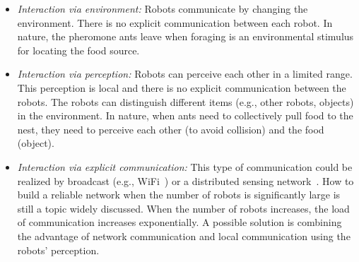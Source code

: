 \begin{itemize}

\item \textit{Interaction via environment:} Robots communicate by changing the environment. There is no explicit communication between each robot. In nature, the pheromone ants leave when foraging is an environmental stimulus for locating the food source.  

\item \textit{Interaction via perception:} Robots can perceive each other in a limited range. This perception is local and there is no explicit communication between the robots. The robots can distinguish different items (e.g., other robots, objects) in the environment. In nature, when ants need to collectively pull food to the nest, they need to perceive each other (to avoid collision) and the food (object).

\item \textit{Interaction via explicit communication:} This type of communication could be realized by broadcast (e.g., WiFi~\cite{Gerkey:TRA:2002}) or a distributed sensing network~\cite{Winfield:LNCS:2000}. How to build a reliable network when the number of robots is significantly large is still a topic widely discussed. When the number of robots increases, the load of communication increases exponentially. A possible solution is combining the advantage of network communication and local communication using the robots' perception.

\end{itemize}


